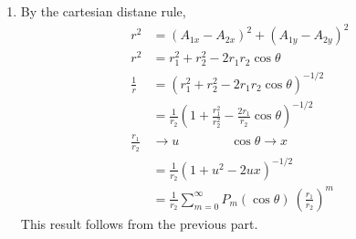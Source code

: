 \begin{enumerate}
\begin{enumerate}
              \item By the cartesian distane rule,
                    \begin{align}
                        r^2             & = (A_{1x} - A_{2x})^2
                        + (A_{1y} - A_{2y})^2                                    \\
                        r^2             & = r_1^2 + r_2^2 - 2r_1 r_2 \cos \theta \\
                        \frac{1}{r}     & = \left( r_1^2 + r_2^2
                        - 2r_1 r_2 \cos \theta \right) ^{-1/2}                   \\
                                        & = \frac{1}{r_2} \left( 1
                        + \frac{r_1^2}{r_2^2}
                        - \frac{2r_1}{r_2} \cos \theta \right)^{-1/2}            \\
                        \frac{r_1}{r_2} & \rightarrow u\qquad \qquad
                        \cos\theta \rightarrow x                                 \\
                                        & = \frac{1}{r_2} (1 + u^2 - 2ux)^{-1/2} \\
                                        & = \frac{1}{r_2} \sum_{m = 0}^{\infty}
                        P_m(\cos \theta)\ \left( \frac{r_1}{r_2} \right)^m
                    \end{align}
                    This result follows from the previous part.


\end{enumerate}
\end{enumerate}

